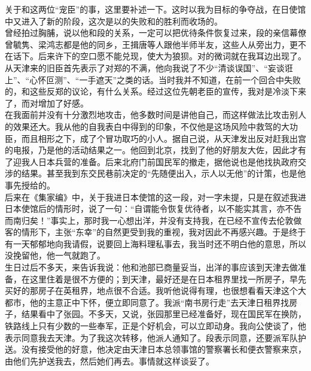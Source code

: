 关于和这两位“宠臣”的事，这里要补述一下。这时以我为目标的争夺战，在日使馆中又进入了新的阶段，这次是以的失败和的胜利而收场的。\\

曾经拍过胸脯，说以他和段的关系，一定可以把优待条件恢复过来，段的亲信幕僚曾毓隽、梁鸿志都是他的同乡，王揖唐等人跟他半师半友，这些人从旁出力，更不在话下。后来许下的空口愿不能兑现，使大为狼狈。对的微词就在我耳边出现了。从天津来的旧臣首先表示了对郑的不满，他向我说了不少“清谈误国”、“妄谈诳上”、“心怀叵测”、“一手遮天”之类的话。当时我并不知道，在前一个回合中失败的，和这些反郑的议论，有什么关系。经过这位先朝老臣的宣传，我对是冷淡下来了，而对增加了好感。\\

在我面前并没有十分激烈地攻击，他多数时间是讲他自己，而这样做法比攻击别人的效果还大。我从他的自我表白中得到的印象，不仅他是这场风险中救驾的大功臣，而且相形之下，成了个冒功取巧的小人。据自己说，从天津发出反对赶我出宫的电报，乃是他的活动结果之一。他回到北京，找到了他的好朋友大佐，因此才有了迎我人日本兵营的准备。后来北府门前国民军的撤走，据他说也是他找执政府交涉的结果。甚至我到东交民巷前决定的“先随便出入，示人以无他”的计策，也是他事先授给的。\\

后来在《集家编》中，关于我进日本使馆的这一段，对一字未提，只是在叙述我进日本使馆后的情形时，说了一句：“自谓能令恢复优待者，以不能实其言，亦不告而南归矣！”事实上，那时我一心想出洋，并没有支持我，在已经不宣传去伦敦做客的情形下，主张“东幸”的自然更受到我的重视，我对因此不再感兴趣。于是终于有一天郁郁地向我请假，说要回上海料理私事去，我当时还不明白他的意思，所以没挽留他，他一气就跑了。\\

生日过后不多天，来告诉我说：他和池部已商量妥当，出洋的事应该到天津去做准备，在这里住着是很不方便的；到天津，最好还是在日本租界里找一所房子，早先买好的那房子在英租界，地点很不合适。我听他说得有理，也很想看看天津这个大都市，他的主意正中下怀，便立即同意了。我派“南书房行走”去天津日租界找房子，结果看中了张园。不多天，又说，张园那里已经准备好，现在国民军在换防，铁路线上只有少数的一些奉军，正是个好机会，可以立即动身。我向公使谈了，他表示同意我去天津。为了我这次转移，他派人通知了。段表示同意，还要派军队护送。没有接受他的好意，他决定由天津日本总领事馆的警察署长和便衣警察来京，由他们先护送我去，然后她们再去。事情就这样谈妥了。\\

